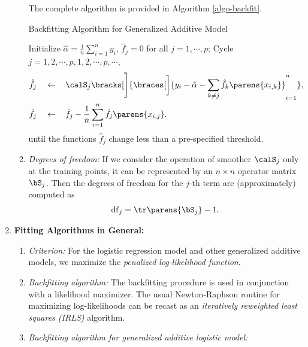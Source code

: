 \documentclass[12pt]{article}
\begin{document}
\begin{enumerate}[label=\textbf{\arabic*.}]
\begin{enumerate}
		The complete algorithm is provided in Algorithm \ref{algo-backfit}. 
		
		\begin{minipage}{\linewidth}
			\begin{algorithm}[H]
				\caption{Backfitting Algorithm for Generalized Additive Model}\label{algo-backfit}
				\begin{algorithmic}[1]
				
				\STATE Initialize $\hat{\alpha} = \frac{1}{n} \sum_{i=1}^n y_i$, $\hat{f}_j = 0$ for all $j = 1, \cdots, p$; 
				\STATE Cycle $j = 1, 2, \cdots, p, 1, 2, \cdots, p, \cdots$, 
				\begin{align*}
					\hat{f}_j \quad \leftarrow & \, \quad \calS_j \bracks[\Bigg]{\braces[\bigg]{y_i - \hat{\alpha} - \sum_{k \neq j} \hat{f}_{k} \parens{x_{i, k}}}_{i=1}^n}, \\ 
					\hat{f}_j \quad \leftarrow & \, \quad \hat{f}_j - \frac{1}{n} \sum_{i=1}^n \hat{f}_j \parens{x_{i,j}}. 
				\end{align*}
				until the functions $\hat{f}_j$ change less than a pre-specified threshold. 
				\end{algorithmic}
			\end{algorithm}
		\end{minipage}
		
		\item \textit{Degrees of freedom:} If we consider the operation of smoother $\calS_j$ only at the training points, it can be represented by an $n \times n$ operator matrix $\bS_j$. Then the degrees of freedom for the $j$-th term are (approximately) computed as 
		\begin{align}
			\mathrm{df}_j = \tr \parens{\bS_j} - 1. 
		\end{align}
	\end{enumerate}
	
	\item \textbf{Fitting Algorithms in General:} 
	\begin{enumerate}
		\item \textit{Criterion:} For the logistic regression model and other generalized additive models, we maximize the \emph{penalized log-likelihood function}. 
		\item \textit{Backfitting algorithm:} The backfitting procedure is used in conjunction with a likelihood maximizer. The usual Newton-Raphson routine for maximizing log-likelihoods can be recast as an \emph{iteratively reweighted least squares (IRLS)} algorithm. %
		\item \textit{Backfitting algorithm for generalized additive logistic model:} 
		

\end{enumerate}
\end{enumerate}
\end{document}
